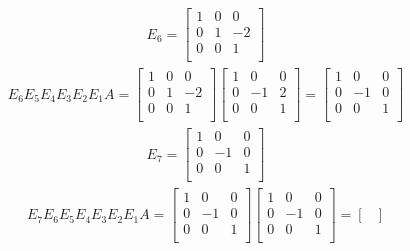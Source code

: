 \documentclass[12pt]{article}
\begin{document}
\begin{enumerate}
\begin{align*}
      E_6 =
      \begin{bmatrix}
        1 & 0 & 0\\
        0 & 1 & -2\\
        0 & 0 & 1\\
      \end{bmatrix}
    \end{align*}
    \begin{align*}
      E_6E_5E_4E_3E_2E_1A =
      \begin{bmatrix}
        1 & 0 & 0\\
        0 & 1 & -2\\
        0 & 0 & 1\\
      \end{bmatrix}
      \begin{bmatrix}
        1 &  0 & 0\\
        0 & -1 & 2\\
        0 &  0 & 1\\
      \end{bmatrix}
      =
      \begin{bmatrix}
        1 &  0 & 0\\
        0 & -1 & 0\\
        0 &  0 & 1\\
      \end{bmatrix}
    \end{align*}
    \begin{align*}
      E_7 =
      \begin{bmatrix}
        1 &  0 & 0\\
        0 & -1 & 0\\
        0 &  0 & 1\\
      \end{bmatrix}
    \end{align*}
    \begin{align*}
      E_7E_6E_5E_4E_3E_2E_1A =
      \begin{bmatrix}
        1 &  0 & 0\\
        0 & -1 & 0\\
        0 &  0 & 1\\
      \end{bmatrix}
      \begin{bmatrix}
        1 &  0 & 0\\
        0 & -1 & 0\\
        0 &  0 & 1\\
      \end{bmatrix}
      =
      \begin{bmatrix}

\end{bmatrix}
\end{align*}
\end{enumerate}
\end{document}
